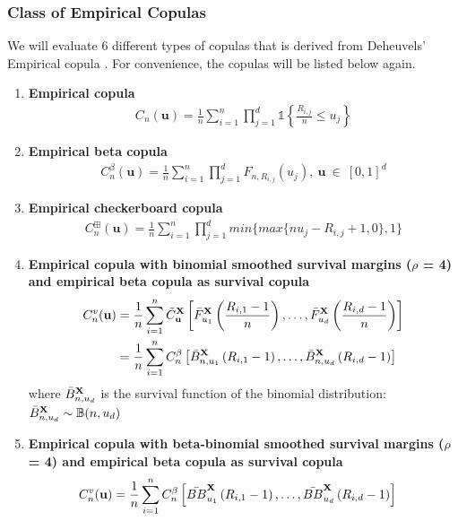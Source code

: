 \documentclass[12pt]{report}
\newcommand{\1}{\mathbf{1}}
\begin{document}
\begin{flushleft}
\subsubsection{Class of Empirical Copulas}

We will evaluate 6 different types of copulas that is derived from Deheuvels' Empirical copula \parencite{DeheuvelsEC}. For convenience, the copulas will be listed below again.
\begin{enumerate}
\item \textbf{Empirical copula}
\begin{align*}
C_{n}(\textbf{u}) = \frac{1}{n} \sum\limits_{i = 1}^{n} \prod\limits_{j = 1}^{d} \mathds{1}\left\{ \frac{R_{i,j}}{n} \le u_{j} \right\}
\end{align*}
\item \textbf{Empirical beta copula}
\begin{align*}
C^{\beta}_{n}(\textbf{u}) = \frac{1}{n} \sum\limits_{i = 1}^{n} \prod\limits_{j = 1}^{d} F_{n,R_{i,j}}(u_{j}), \: \textbf{u} \: \in \: [0,1]^{d}
\end{align*}
\item \textbf{Empirical checkerboard copula}
\begin{align*}
C_{n}^{\boxplus}(\textbf{u}) = \frac{1}{n} \sum\limits_{i = 1}^{n} \prod\limits_{j = 1}^{d} min \{ max \{ n u_{j} - R_{i,j} + 1, 0 \}, 1 \}
\end{align*}
\item \textbf{Empirical copula with binomial smoothed survival margins ($\rho$ = 4) and empirical beta copula as survival copula}
\begin{align*}
C_{n}^{v}(\textbf{u}) &= \frac{1}{n} \sum\limits_{i = 1}^{n} \Tilde{C}_{\textbf{u}}^{\textbf{X}} \left[\Bar{F}_{u_{1}}^{\textbf{X}}\left(\frac{R_{i,1} - 1}{n}\right), \dots, \Bar{F}_{u_{d}}^{\textbf{X}}\left(\frac{R_{i,d} - 1}{n}\right) \right] \\
&= \frac{1}{n} \sum\limits_{i = 1}^{n} C_{n}^{\beta} \left[\Bar{B}_{n, u_{1}}^{\textbf{X}}\left(R_{i,1} - 1\right), \dots, \Bar{B}_{n, u_{d}}^{\textbf{X}}\left(R_{i,d} - 1\right) \right]
\end{align*}
where $\Bar{B}_{n, u_{d}}^{\textbf{X}}$ is the survival function of the binomial distribution: $\Bar{B}_{n, u_{d}}^{\textbf{X}} \sim \mathbb{B}(n, u_{d})$
\item \textbf{Empirical copula with beta-binomial smoothed survival margins ($\rho$ = 4) and empirical beta copula as survival copula}
\begin{align*}
C_{n}^{v}(\textbf{u}) &= \frac{1}{n} \sum\limits_{i = 1}^{n} C_{n}^{\beta} \left[\Bar{BB}_{u_{1}}^{\textbf{X}}\left(R_{i,1} - 1\right), \dots, \Bar{BB}_{u_{d}}^{\textbf{X}}\left(R_{i,d} - 1\right) \right]

\end{align*}
\end{enumerate}
\end{flushleft}
\end{document}
